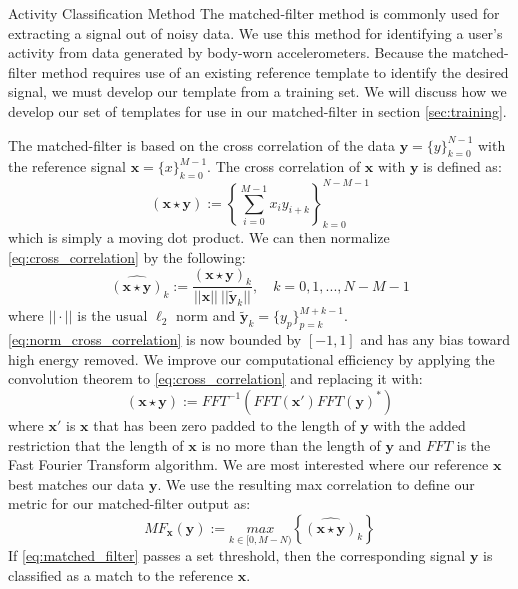 \documentclass[unknownkeysallowed,final]{beamer}
\begin{document}
\begin{frame}{}
\begin{textblock}{19.5}
\begin{block}{\small{Activity Classification Method}}
The matched-filter method is commonly used for extracting a signal out of noisy data.
We use this method for identifying a user's activity from data generated by body-worn accelerometers.
Because the matched-filter method requires use of an existing reference template to identify the desired signal, we must develop our template from a training set.
We will discuss how we develop our set of templates for use in our matched-filter in section \ref{sec:training}.

The matched-filter is based on the cross correlation of the data $\textbf{y} = \{y\}_{k=0}^{N-1}$ with the reference signal $\textbf{x} = \{x\}_{k=0}^{M-1}$.
The cross correlation of $\textbf{x}$ with $\textbf{y}$ is defined as:
%
\begin{equation} \label{eq:cross_correlation}
(\textbf{x} \star \textbf{y}) := \left \{\sum_{i=0}^{M-1}x_{i} y_{i+k} \right \}_{k=0}^{N-M-1}
\end{equation}
%
which is simply a moving dot product.
We can then normalize \eqref{eq:cross_correlation} by the following:
%
\begin{equation} \label{eq:norm_cross_correlation}
\widehat{(\textbf{x} \star \textbf{y})}_k := \frac{(\textbf{x} \star \textbf{y})_k}{||\textbf{x}|| \ || \widetilde{\textbf{y}}_k || }, \quad k = 0,1,...,N-M-1
\end{equation}
%
where $|| \cdot ||$ is the usual $\ell_2$ norm and $\widetilde{\textbf{y}}_k = \{y_p\}_{p=k}^{M+k-1}$.
\eqref{eq:norm_cross_correlation} is now bounded by $[-1,1]$ and has any bias toward high energy removed.
We improve our computational efficiency by applying the convolution theorem to \eqref{eq:cross_correlation} and replacing it with:
%
\begin{equation} \label{eq:conv_theorem}
(\textbf{x} \star \textbf{y}) := FFT^{-1}(FFT(\textbf{x}') FFT(\textbf{y})^*)
\end{equation}
%
where $\textbf{x}'$ is $\textbf{x}$ that has been zero padded to the length of $\textbf{y}$ with the added restriction that the length of $\textbf{x}$ is no more than the length of $\textbf{y}$ and $FFT$ is the Fast Fourier Transform algorithm.
We are most interested where our reference $\textbf{x}$ best matches our data $\textbf{y}$.
We use the resulting max correlation to define our metric for  our matched-filter output as:
%
\begin{equation} \label{eq:matched_filter}
MF_{\textbf{x}}(\textbf{y}) := \underset{k \in [0, M-N)}{max} \left \{\widehat{(\textbf{x} \star \textbf{y})}_k \right \}
\end{equation}
%
If \eqref{eq:matched_filter} passes a set threshold, then the corresponding signal $\textbf{y}$ is classified as a match to the reference $\textbf{x}$.


\end{block}
\end{textblock}
\end{frame}
\end{document}
